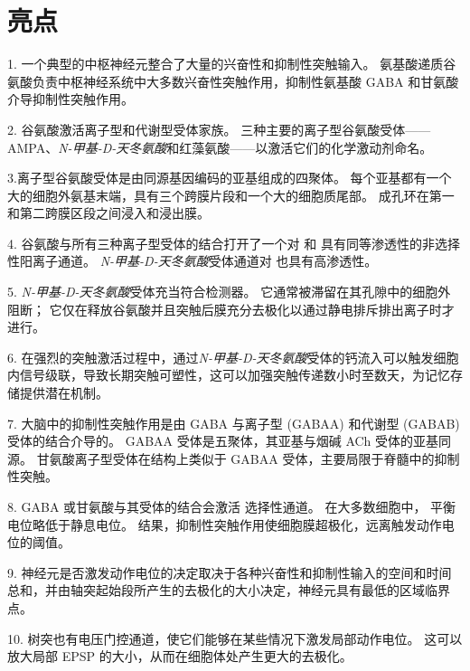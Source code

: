 \section{亮点}

1. 一个典型的中枢神经元整合了大量的兴奋性和抑制性突触输入。
氨基酸递质谷氨酸负责中枢神经系统中大多数兴奋性突触作用，抑制性氨基酸 GABA 和甘氨酸介导抑制性突触作用。 


2. 谷氨酸激活离子型和代谢型受体家族。
三种主要的离子型谷氨酸受体——AMPA、\textit{N-甲基-D-天冬氨酸}和红藻氨酸——以激活它们的化学激动剂命名。 


3.离子型谷氨酸受体是由同源基因编码的亚基组成的四聚体。
每个亚基都有一个大的细胞外氨基末端，具有三个跨膜片段和一个大的细胞质尾部。
成孔环在第一和第二跨膜区段之间浸入和浸出膜。 


4. 谷氨酸与所有三种离子型受体的结合打开了一个对  和  具有同等渗透性的非选择性阳离子通道。
\textit{N-甲基-D-天冬氨酸}受体通道对  也具有高渗透性。


5. \textit{N-甲基-D-天冬氨酸}受体充当符合检测器。
它通常被滞留在其孔隙中的细胞外  阻断；
它仅在释放谷氨酸并且突触后膜充分去极化以通过静电排斥排出离子时才进行。 


6. 在强烈的突触激活过程中，通过\textit{N-甲基-D-天冬氨酸}受体的钙流入可以触发细胞内信号级联，导致长期突触可塑性，这可以加强突触传递数小时至数天，为记忆存储提供潜在机制。 


7. 大脑中的抑制性突触作用是由 GABA 与离子型 (GABAA) 和代谢型 (GABAB) 受体的结合介导的。
GABAA 受体是五聚体，其亚基与烟碱 ACh 受体的亚基同源。
甘氨酸离子型受体在结构上类似于 GABAA 受体，主要局限于脊髓中的抑制性突触。 


8. GABA 或甘氨酸与其受体的结合会激活  选择性通道。
在大多数细胞中， 平衡电位略低于静息电位。
结果，抑制性突触作用使细胞膜超极化，远离触发动作电位的阈值。 


9. 神经元是否激发动作电位的决定取决于各种兴奋性和抑制性输入的空间和时间总和，并由轴突起始段所产生的去极化的大小决定，神经元具有最低的区域临界点。 


10. 树突也有电压门控通道，使它们能够在某些情况下激发局部动作电位。
这可以放大局部 EPSP 的大小，从而在细胞体处产生更大的去极化。







